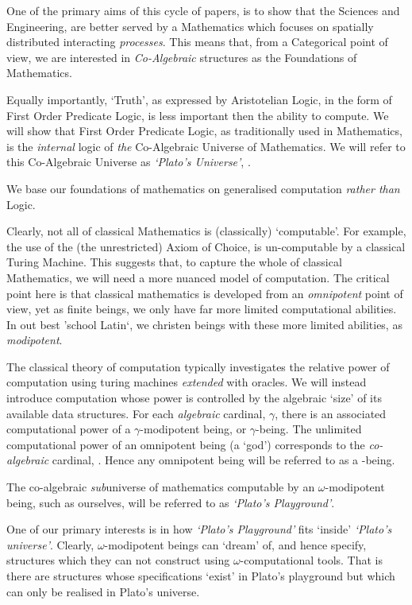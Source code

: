 \documentclass[a4paper,openany]{amsbook}
\begin{document}
One of the primary aims of this cycle of papers, is to show that the Sciences
and Engineering, are better served by a Mathematics which focuses on spatially
distributed interacting \emph{processes}. This means that, from a Categorical
point of view, we are interested in \emph{Co-Algebraic} structures as the
Foundations of Mathematics.

Equally importantly, `Truth', as expressed by Aristotelian Logic, in the form of
First Order Predicate Logic, is less important then the ability to compute. We
will show that First Order Predicate Logic, as traditionally used in
Mathematics, is the \emph{internal} logic of \emph{the} Co-Algebraic Universe of
Mathematics. We will refer to this Co-Algebraic Universe as \emph{`Plato's
Universe'}, \Universe{}{}.

We base our foundations of mathematics on generalised computation \emph{rather
than} Logic.

Clearly, not all of classical Mathematics is (classically) `computable'. For
example, the use of the (the unrestricted) Axiom of Choice, is un-computable by
a classical Turing Machine. This suggests that, to capture the whole of
classical Mathematics, we will need a more nuanced model of computation. The
critical point here is that classical mathematics is developed from an
\emph{omnipotent} point of view, yet as finite beings, we only have far more
limited computational abilities. In out best 'school Latin`, we christen beings
with these more limited abilities, as \emph{modipotent}.

The classical theory of computation typically investigates the relative power of
computation using turing machines \emph{extended} with oracles. We will instead
introduce computation whose power is controlled by the algebraic `size' of its
available data structures. For each \emph{algebraic} cardinal, $\gamma$, there
is an associated computational power of a $\gamma$-modipotent being, or
$\gamma$-being. The unlimited computational power of an omnipotent being (a
`god') corresponds to the \emph{co-algebraic} cardinal, \Cardinal. Hence any
omnipotent being will be referred to as a \Cardinal-being.

The co-algebraic \emph{sub}universe of mathematics computable by an
$\omega$-modipotent being, such as ourselves, will be referred to as
\emph{`Plato's Playground'}.

One of our primary interests is in how \emph{`Plato's Playground'} fits `inside'
\emph{`Plato's universe'}. Clearly, $\omega$-modipotent beings can `dream' of,
and hence specify, structures which they can not construct using
$\omega$-computational tools. That is there are structures whose specifications
`exist' in Plato's playground but which can only be realised in Plato's
universe.
\end{document}
